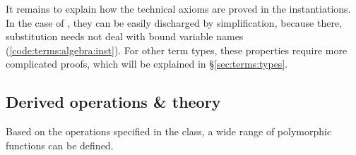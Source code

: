 It remains to explain how the technical  axioms are proved in the instantiations.
In the case of , they can be easily discharged by simplification, because there, substitution needs not deal with bound variable names (\cref{code:terms:algebra:inst}).
For other term types, these properties require more complicated proofs, which will be explained in §\ref{sec:terms:types}.

\subsection{Derived operations \& theory}
\label{sec:terms:algebra:thy}

Based on the operations specified in the  class, a wide range of polymorphic functions can be defined.

